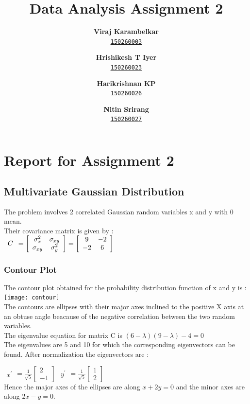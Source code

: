 \documentclass{extarticle}
\author{
	\textbf{Viraj Karambelkar} \\
	\texttt{\href{mailto:150260003@iitb.ac.in}{\underline{150260003}}}
	\and
	\textbf{Hrishikesh T Iyer} \\
	\texttt{\href{mailto:150260023@iitb.ac.in}{\underline{150260023}}}
	\and
	\textbf{Harikrishnan KP} \\
	\texttt{\href{mailto:150260026@iitb.ac.in}{\underline{150260026}}}
	\and
	\textbf{Nitin Srirang} \\
	\texttt{\href{mailto:150260027@iitb.ac.in}{\underline{150260027}}}
	}
\title{\color{red}\huge{Data Analysis Assignment 2}}
\begin{document}
	\maketitle
	\newpage
	\tableofcontents
	\newpage
	\section{\color{Blue} Report for Assignment 2}
	\subsection{\color{MidnightBlue} Multivariate Gaussian Distribution}
		The problem involves 2 correlated Gaussian random variables x and y with 0 mean.
		\\ Their covariance matrix is given by : \\
		$ \begin{array}{c} C \end{array} = \left [\begin{array}{c c}\sigma _{x}^{2} & \sigma _{xy} \\\sigma _{xy} & \sigma _{y}^			{2}\end{array} \right ] = \left [\begin{array}{c c} 9 & -2 \\-2 & 6\end{array} \right ] $
		\subsubsection{\color{RoyalBlue} Contour Plot}
			The contour plot obtained for the probability distribution function of x and y is : \\
			\texttt{[image: contour]} \\
			The contours are ellipses with their major axes inclined to the positive X axis at an obtuse angle beacause of the 				negative correlation between the two random variables. \\
			The eigenvalue equation for matrix C is $ (6-\lambda)(9-\lambda)-4=0 $ \\
			The eigenvalues are 5 and 10 for which the corresponding eigenvectors can be found. After normalization the
			eigenvectors are :

			$ \begin{array}{c} x^{'} \end{array} = \frac{1}{\sqrt{5}} \left [\begin{array}{c} 2\\-1 \end{array} \right ] $
			$ \begin{array}{c} y^{'} \end{array} = \frac{1}{\sqrt{5}} \left [\begin{array}{c} 1\\2 \end{array} \right ] $ \\
			Hence the major axes of the ellipses are along $ x+2y=0 $ and the minor axes are along $ 2x-y=0 . $
\end{document}
